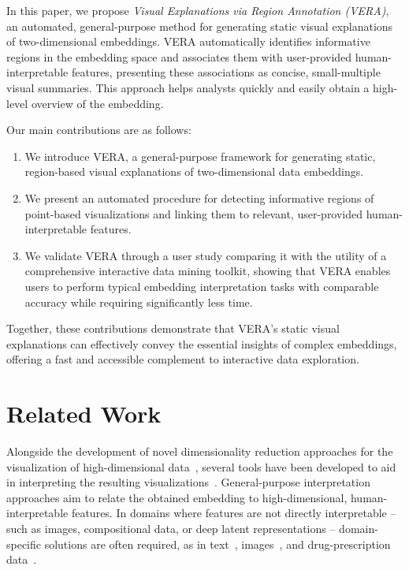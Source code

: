 \documentclass[lettersize,journal]{IEEEtran}
\begin{document}
In this paper, we propose \textit{Visual Explanations via Region Annotation (VERA)}, an automated, general-purpose method for generating static visual explanations of two-dimensional embeddings. VERA automatically identifies informative regions in the embedding space and associates them with user-provided human-interpretable features, presenting these associations as concise, small-multiple visual summaries. This approach helps analysts quickly and easily obtain a high-level overview of the embedding.

Our main contributions are as follows:
\begin{enumerate}
  \item We introduce VERA, a general-purpose framework for generating static, region-based visual explanations of two-dimensional data embeddings.
  \item We present an automated procedure for detecting informative regions of point-based visualizations and linking them to relevant, user-provided human-interpretable features.
  \item We validate VERA through a user study comparing it with the utility of a comprehensive interactive data mining toolkit, showing that VERA enables users to perform typical embedding interpretation tasks with comparable accuracy while requiring significantly less time.
\end{enumerate}

Together, these contributions demonstrate that VERA’s static visual explanations can effectively convey the essential insights of complex embeddings, offering a fast and accessible complement to interactive data exploration.

\section{Related Work}
\label{sec:related_work}

Alongside the development of novel dimensionality reduction approaches for the visualization of high-dimensional data~\cite{Kruskal1978,Maaten2008,McInnes2018}, several tools have been developed to aid in interpreting the resulting visualizations~\cite{ChengMueller2016,Marcilio2021,Fujiwara2020}.
General-purpose interpretation approaches aim to relate the obtained embedding to high-dimensional, human-interpretable features.
In domains where features are not directly interpretable -- such as images, compositional data, or deep latent representations -- domain-specific solutions are often required, as in text~\cite{Heimerl2016,WangHohmanChau2023}, images~\cite{Liu2019,Ye2024}, and drug-prescription data~\cite{Policar2023}.
\end{document}

